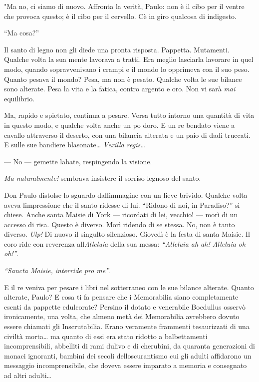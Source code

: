 "Ma no, ci siamo di nuovo. Affronta la verità, Paulo: non è il cibo per
il ventre che provoca questo; è il cibo per il cervello.
C\textquotesingle è in giro qualcosa di indigesto.

``Ma cosa?''

Il santo di legno non gli diede una pronta risposta. Pappetta.
Mutamenti. Qualche volta la sua mente lavorava a tratti. Era meglio
lasciarla lavorare in quel modo, quando sopravvenivano i crampi e il
mondo lo opprimeva con il suo peso. Quanto pesava il mondo? Pesa, ma non
è pesato. Qualche volta le sue bilance sono alterate. Pesa la vita e la
fatica, contro argento e oro. Non vi sarà \emph{mai} equilibrio.

Ma, rapido e spietato, continua a pesare. Versa tutto intorno una
quantità di vita in questo modo, e qualche volta anche un
po\textquotesingle{} d\textquotesingle oro. E un re bendato viene a
cavallo attraverso il deserto, con una bilancia alterata e un paio di
dadi truccati. E sulle sue bandiere blasonate\ldots{} \emph{Vexilla
	regis\ldots{}}

--- No --- gemette l\textquotesingle abate, respingendo la visione.

\emph{Ma naturalmente!} sembrava insistere il sorriso legnoso del santo.

Don Paulo distolse lo sguardo dall\textquotesingle immagine con un lieve
brivido. Qualche volta aveva l\textquotesingle impressione che il santo
ridesse di lui. ``Ridono di noi, in Paradiso?'' si chiese. Anche santa
Maisie di York --- ricordati di lei, vecchio! --- morì di un accesso di
risa. Questo è diverso. Morì ridendo di se stessa. No, non è tanto
diverso. \emph{Ulp!} Di nuovo il singulto silenzioso. Giovedì è la festa
di santa Maisie. Il coro ride con reverenza
all\textquotesingle{}\emph{Alleluia} della sua messa: \emph{``Alleluia
	ah ah! Alleluia oh oh!''}.

\emph{``Sancta Maisie, interride pro me''.}

E il re veniva per pesare i libri nel sotterraneo con le sue bilance
alterate. Quanto alterate, Paulo? E cosa ti fa pensare che i Memorabilia
siano completamente esenti da pappette edulcorate? Persino il dotato e
venerabile Boedullus osservò ironicamente, una volta, che almeno metà
dei Memorabilia avrebbero dovuto essere chiamati gli Inscrutabilia.
Erano veramente frammenti tesaurizzati di una civiltà morta\ldots{} ma
quanto di essi era stato ridotto a balbettamenti incomprensibili,
abbelliti di rami d\textquotesingle ulivo e di cherubini, da quaranta
generazioni di monaci ignoranti, bambini dei secoli
dell\textquotesingle oscurantismo cui gli adulti affidarono un messaggio
incomprensibile, che doveva essere imparato a memoria e consegnato ad
altri adulti\ldots{}

